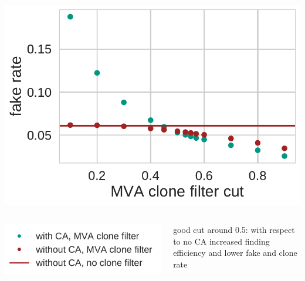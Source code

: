\documentclass[18pt, aspectratio=169]{beamer}
\begin{document}
\begin{frame}
\begin{columns}
\begin{column}{0.3\textwidth}
      \includegraphics[width=1.0\textwidth]{figures/ca_fake_rate.pdf}
    \end{column}
  \end{columns}
  \begin{columns}
    \begin{column}{.4\textwidth}
      \includegraphics[width=.7\textwidth]{figures/legend_ca_fom_fullreco.pdf}
    \end{column}
    \begin{column}{.6\textwidth}
      good cut around 0.5: with respect to no CA increased finding efficiency and lower fake and
      clone rate
    \end{column}
  \end{columns}  
\end{frame}
\end{document}
